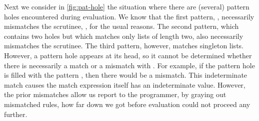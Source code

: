 Next we consider in \autoref{fig:pat-hole} the situation where there are (several) pattern holes encountered during evaluation. 
We know that the first pattern, \li{[]}, necessarily mismatches the scrutinee, , for the usual reasons.
The second pattern, which contains two holes but which matches only lists of length two, also necessarily mismatches the scrutinee.
The third pattern, however, matches singleton lists. However, a pattern hole appears at its head, so it cannot be determined 
whether there is necessarily a match or a mismatch with . For example, if the pattern hole is filled with the pattern , 
then there would be a mismatch. This indeterminate match causes the match expression itself has an indeterminate value.
However, the prior mismatches allow us report to the programmer, by graying out mismatched rules, how far down we got before evaluation could not proceed any further.